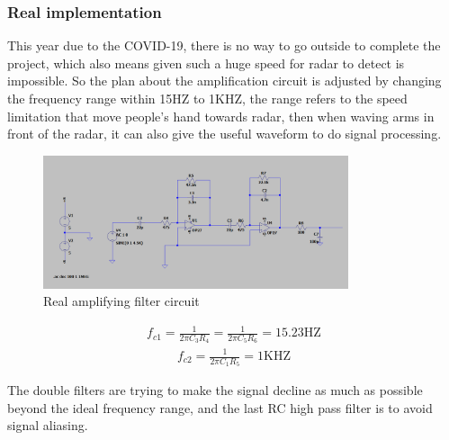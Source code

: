 \subsubsection{Real implementation}
This year due to the COVID-19, there is no way to go outside to complete the project, which also means given such a huge speed for radar to detect is impossible. So the plan about the amplification circuit is adjusted by changing the frequency range within 15HZ to 1KHZ, the range refers to the speed limitation that move people's hand towards radar, then when waving arms in front of the radar, it can also give the useful waveform to do signal processing.
\begin{figure}[H]
    \centering
    \includegraphics[width=0.8\textwidth]{figure/realamplifyingfiltercircuit.png}
    \caption{Real amplifying filter circuit}
\end{figure}
\begin{align}
f_{c 1}=\frac{1}{2 \pi C_{3} R_{4}}=\frac{1}{2 \pi C_{5} R_{6}}=15.23 \mathrm{HZ}
\end{align}
\begin{align}
f_{c 2}=\frac{1}{2 \pi C_{1} R_{5}}=1 \mathrm{KHZ}
\end{align}

The double filters are trying to make the signal decline as much as possible beyond the ideal frequency range, and the last RC high pass filter is to avoid signal aliasing. 
